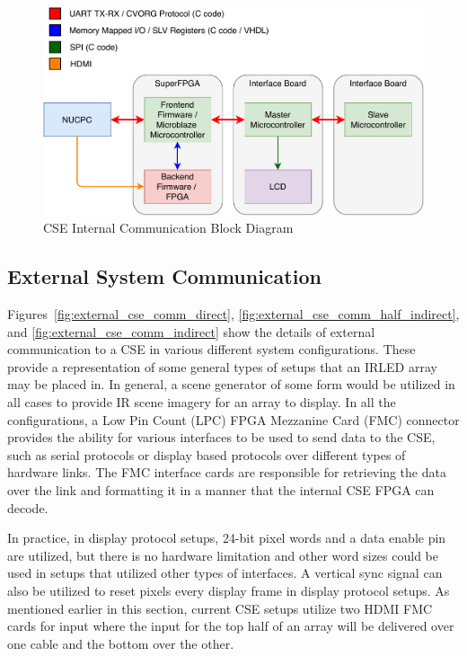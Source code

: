         \begin{figure}
            \centering
            \includegraphics[width=1.0\textwidth]{fig/cse_comm_block.pdf}
            \caption{CSE Internal Communication Block Diagram}
            \label{fig:cse_comm_block}
        \end{figure}

    \subsection{External System Communication}
        Figures~\ref{fig:external_cse_comm_direct}, \ref{fig:external_cse_comm_half_indirect}, and \ref{fig:external_cse_comm_indirect} show the details of external communication to a CSE in various different system configurations. These provide a representation of some general types of setups that an IRLED array may be placed in. In general, a scene generator of some form would be utilized in all cases to provide IR scene imagery for an array to display. In all the configurations, a Low Pin Count (LPC) FPGA Mezzanine Card (FMC) connector provides the ability for various interfaces to be used to send data to the CSE, such as serial protocols or display based protocols over different types of hardware links. The FMC interface cards are responsible for retrieving the data over the link and formatting it in a manner that the internal CSE FPGA can decode.

        In practice, in display protocol setups, 24-bit pixel words and a data enable pin are utilized, but there is no hardware limitation and other word sizes could be used in setups that utilized other types of interfaces. A vertical sync signal can also be utilized to reset pixels every display frame in display protocol setups. As mentioned earlier in this section, current CSE setups utilize two HDMI FMC cards for input where the input for the top half of an array will be delivered over one cable and the bottom over the other.

